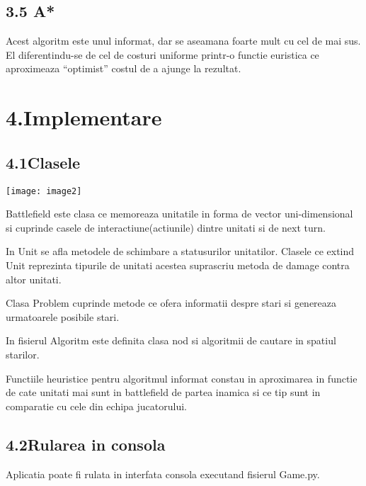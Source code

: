 \documentclass{article} %
\begin{document}
\noindent 

\noindent 
\subsection{3.5 A*}

\noindent 

\noindent Acest algoritm este unul informat, dar se aseamana foarte mult cu cel de mai sus. El diferentindu-se de cel de costuri uniforme printr-o functie euristica ce aproximeaza ``optimist'' costul de a ajunge la rezultat.

\noindent 

\noindent 
\section{4.Implementare}

\noindent 
\subsection{4.1Clasele}

\noindent \texttt{[image: image2]}

\noindent Battlefield este clasa ce memoreaza unitatile in forma de vector uni-dimensional si cuprinde casele de interactiune(actiunile) dintre unitati si de next turn.

\noindent In Unit se afla metodele de schimbare a statusurilor unitatilor. Clasele ce extind Unit reprezinta tipurile de unitati acestea suprascriu metoda de damage contra altor unitati.

\noindent Clasa Problem cuprinde metode ce ofera informatii despre stari si genereaza urmatoarele posibile stari.

\noindent In fisierul Algoritm este definita clasa nod si algoritmii de cautare in spatiul starilor.

\noindent Functiile heuristice pentru algoritmul informat constau in aproximarea in functie de cate unitati mai sunt in battlefield de partea inamica si ce tip sunt in comparatie cu cele din echipa jucatorului.

\noindent 

\noindent 
\subsection{4.2Rularea in consola}

\noindent 

\noindent Aplicatia poate fi rulata in interfata consola executand fisierul Game.py.
\end{document}
